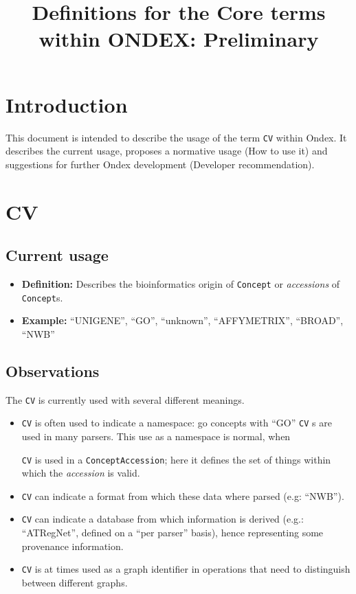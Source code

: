 \documentclass[a4paper,10pt]{article}
\title{Definitions for the Core terms within ONDEX: Preliminary}
\newcommand{\defn}[1]{\item\textbf{Definition: }#1\xspace}
\newcommand{\example}[1]{\item\textbf{Example: }#1\xspace}
\newcommand{\field}[1]{\textit{#1}\xspace}
\newcommand{\term}[1]{\texttt{#1}\xspace}
\begin{document}
\maketitle

\section{Introduction}

This document is intended to describe the usage of the term \term{CV} within
Ondex. It describes the current usage, proposes a normative usage (How to use
it) and suggestions for further Ondex development (Developer recommendation). 


\section{CV}

\subsection{Current usage}

\begin{itemize}

  \defn{Describes the bioinformatics origin of \term{Concept} or
    \field{accessions} of \term{Concept}{}s.}
  
  \example{``UNIGENE'', ``GO'', ``unknown'', ``AFFYMETRIX'', ``BROAD'', ``NWB''}
\end{itemize}

\subsection{Observations}

\newcommand{\cv}{\term{CV}}
The \term{CV} is currently used with several different meanings. 

\begin{itemize}

\item \term{CV} is often used to indicate a namespace: go concepts with ``GO''
  \term{CV}s are used in many parsers. This use as a namespace is normal, when

  \term{CV} is used in a \term{ConceptAccession}; here it defines the set of
  things within which the \field{accession} is valid.
  
\item \term{CV} can indicate a format from which these data where parsed
  (e.g: ``NWB'').

\item \term{CV} can indicate a database from which information is
  derived (e.g.: ``ATRegNet'', defined on a ``per parser'' basis), hence
  representing some provenance information.
  
\item \term{CV} is at times used as a graph identifier in operations that need to distinguish between different graphs.

\end{itemize}
\end{document}
